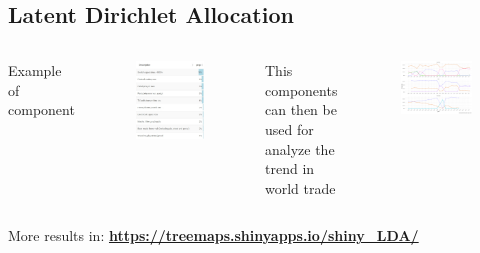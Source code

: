 \documentclass[compress]{beamer}
\begin{document}
\subsection{Latent Dirichlet Allocation}
\begin{frame}
\begin{columns}[c] 

\small{Example of component}
\begin{figure}
\includegraphics[scale=0.3]{LDA_comp}
\end{figure}


\small{This components can then be used for analyze the trend in world trade} \par
\begin{flushleft}
\begin{figure}
\includegraphics[scale=0.25]{LDA_res}
\end{figure}
\end{flushleft}

\end{columns} 
\medskip
\small{More results in: \textbf{\url{https://treemaps.shinyapps.io/shiny_LDA/}}}
\end{frame}
\end{document}
